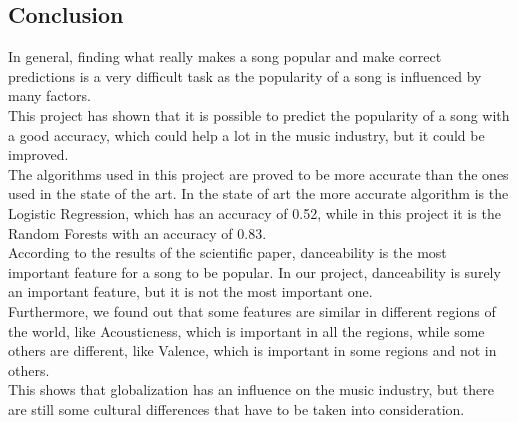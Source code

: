 \subsection{Conclusion}
In general, finding what really makes a song popular and make correct predictions is a very difficult task as the popularity of a song is influenced by many factors.\\ 
This project has shown that it is possible to predict the popularity of a song with a good accuracy, which could help a lot in the music industry, but it could be improved.\\
The algorithms used in this project are proved to be more accurate than the ones used in the state of the art. In the state of art the more accurate algorithm is the Logistic Regression, which has an accuracy of 0.52, while in this project it is the Random Forests with an accuracy of 0.83.\\
According to the results of the scientific paper, danceability is the most important feature for a song to be popular. In our project, danceability is surely an important feature, but it is not the most important one.\\
Furthermore, we found out that some features are similar in different regions of the world, like Acousticness, which is important in all the regions, while some others are different, like Valence, which is important in some regions and not in others.\\
This shows that globalization has an influence on the music industry, but there are still some cultural differences that have to be taken into consideration.\\



